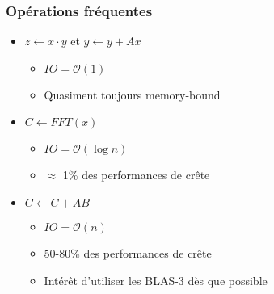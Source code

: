 \documentclass[xcolor={x11names,svgnames}]{beamer}
\newcommand{\bigO}[1]{\ensuremath{\mathcal{O}\left( #1 \right)} }
\begin{document}
\begin{frame}
  \frametitle{Opérations fréquentes}

  \begin{itemize}
  \item $z \gets x \cdot y$ et $y \gets y + Ax$
    \begin{itemize}
    \item $IO = \bigO{1}$
    \item Quasiment toujours \alert{memory-bound} 
    \end{itemize}

    \bigskip

  \item $C \gets FFT(x)$ 
    \begin{itemize}
    \item $IO = \bigO{\log n}$
    \item $\approx$ 1\% des performances de crête
    \end{itemize}

    \bigskip
    
  \item $C \gets C + AB$
    \begin{itemize}
    \item $IO = \bigO{n}$
    \item 50-80\% des performances de crête 
    \item Intérêt d'utiliser les BLAS-3 dès que possible
    \end{itemize}
  \end{itemize}
\end{frame}

\end{document}
